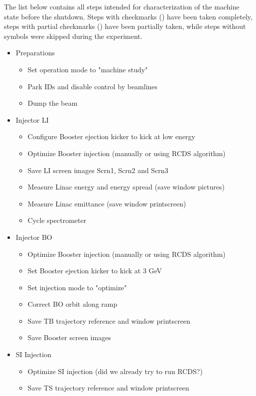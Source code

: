 \documentclass{article}
\newcommand{\pcheckmark}{\checkmark\makebox[0pt][r]{\normalfont\symbol{'26}}}
\begin{document}
The list below contains all steps intended for characterization of the machine state before the shutdown. Steps with checkmarks (\checkmark) have been taken completely, steps with partial checkmarks (\pcheckmark) have been partially taken, while steps without symbols were skipped during the experiment.
\begin{itemize}
\item Preparations
\begin{itemize}
\item Set operation mode to "machine study" \checkmark
\item Park IDs and disable control by beamlines \checkmark
\item Dump the beam \checkmark
\end{itemize}
\item Injector LI
\begin{itemize}
\item Configure Booster ejection kicker to kick at low energy
\item Optimize Booster injection (manually or using RCDS algorithm) \checkmark
\item Save LI screen images Scrn1, Scrn2 and Scrn3 \checkmark
\item Measure Linac energy and energy spread (save window pictures) \checkmark
\item Measure Linac emittance (save window printscreen) \checkmark
\item Cycle spectrometer \checkmark
\end{itemize}
\item Injector BO
\begin{itemize}
\item Optimize Booster injection (manually or using RCDS algorithm) \checkmark
\item Set Booster ejection kicker to kick at 3 GeV \checkmark
\item Set injection mode to "optimize"
\item Correct BO orbit along ramp
\item Save TB trajectory reference and window printscreen \pcheckmark
\item Save Booster screen images \pcheckmark
\end{itemize}
\item SI Injection
\begin{itemize}
\item Optimize SI injection (did we already try to run RCDS?) \checkmark
\item Save TS trajectory reference and window printscreen \pcheckmark

\end{itemize}
\end{itemize}
\end{document}
